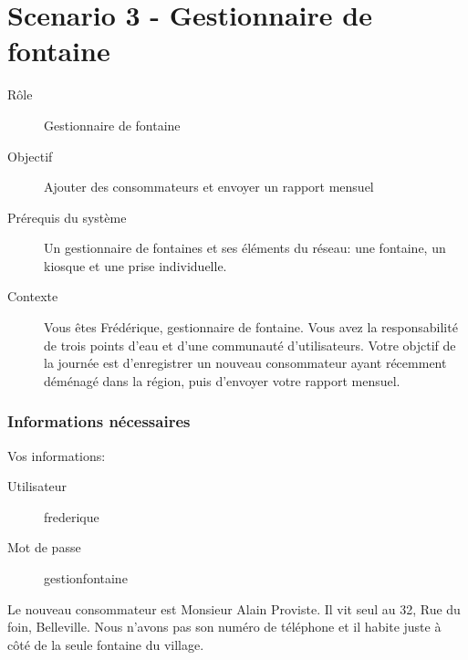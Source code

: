 \documentclass[a4paper, 11pt]{article}
\begin{document}
\newpage

\section*{Scenario 3 - Gestionnaire de fontaine}
    \begin{description}
        \item[Rôle] Gestionnaire de fontaine
        \item[Objectif] Ajouter des consommateurs et envoyer un rapport mensuel
        \item[Prérequis du système] Un gestionnaire de fontaines et ses éléments du réseau: une fontaine, un kiosque et une prise individuelle.
        \item[Contexte] Vous êtes Frédérique, gestionnaire de fontaine. Vous avez la responsabilité de trois points d'eau et d'une communauté d'utilisateurs. Votre objctif de la journée est d'enregistrer un nouveau consommateur ayant récemment déménagé dans la région, puis d'envoyer votre rapport mensuel.
    \end{description}

    \subsubsection*{Informations nécessaires}
    \begin{multicols}{2}
        Vos informations:
        \begin{description}
            \item[Utilisateur] frederique
            \item[Mot de passe] gestionfontaine
        \end{description}
        \vfill\null
        \columnbreak

        Le nouveau consommateur est Monsieur Alain Proviste. Il vit seul au 32, Rue du foin, Belleville. Nous n'avons pas son numéro de téléphone et il habite juste à côté de la seule fontaine du village.
    \end{multicols}
\end{document}
